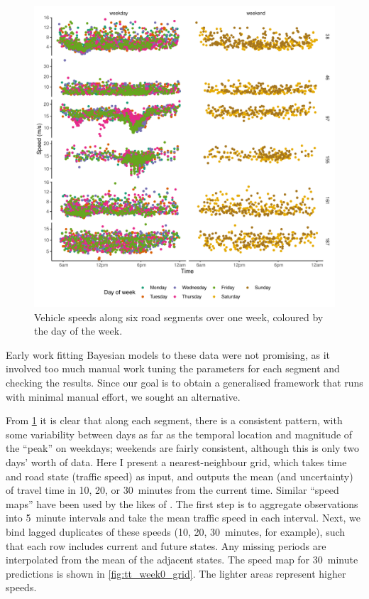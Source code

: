 \begin{knitrout}\small
{}\color{fgcolor}\begin{figure}

{\centering \includegraphics[width=\textwidth]{figure/tt_week0_load-1} 

}

\caption[Vehicle speeds along six road segments over one week]{Vehicle speeds along six road segments over one week, coloured by the day of the week.}\label{fig:tt_week0_load}
\end{figure}


\end{knitrout}

Early work fitting Bayesian models to these data were not promising, as it involved too much manual work tuning the parameters for each segment and checking the results. Since our goal is to obtain a generalised framework that runs with minimal manual effort, we sought an alternative.

From \cref{fig:tt_week0_load} it is clear that along each segment, there is a consistent pattern, with some variability between days as far as the temporal location and magnitude of the ``peak'' on weekdays; weekends are fairly consistent, although this is only two days' worth of data. Here I present a nearest-neighbour grid, which takes time and road state (traffic speed) as input, and outputs the mean (and uncertainty) of travel time in 10, 20, or 30~minutes from the current time. Similar ``speed maps'' have been used by the likes of \citet{Cathey_2003, Celan_2017, Chen_2014}. The first step is to aggregate observations into 5~minute intervals and take the mean traffic speed in each interval. Next, we bind lagged duplicates of these speeds (10, 20, 30~minutes, for example), such that each row includes current and future states. Any missing periods are interpolated from the mean of the adjacent states. The speed map for 30~minute predictions is shown in \cref{fig:tt_week0_grid}. The lighter areas represent higher speeds.

